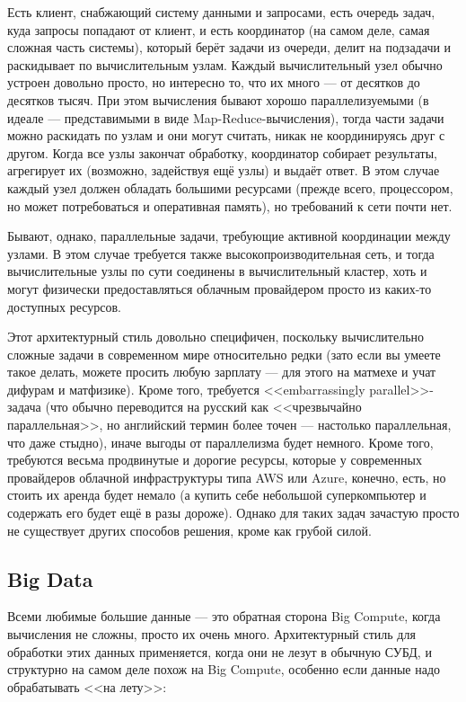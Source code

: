 \documentclass[a5paper]{article}
\begin{document}
Есть клиент, снабжающий систему данными и запросами, есть очередь задач, куда запросы попадают от клиент, и есть координатор (на самом деле, самая сложная часть системы), который берёт задачи из очереди, делит на подзадачи и раскидывает по вычислительным узлам. Каждый вычислительный узел обычно устроен довольно просто, но интересно то, что их много --- от десятков до десятков тысяч. При этом вычисления бывают хорошо параллелизуемыми (в идеале --- представимыми в виде Map-Reduce-вычисления), тогда части задачи можно раскидать по узлам и они могут считать, никак не координируясь друг с другом. Когда все узлы закончат обработку, координатор собирает результаты, агрегирует их (возможно, задействуя ещё узлы) и выдаёт ответ. В этом случае каждый узел должен обладать большими ресурсами (прежде всего, процессором, но может потребоваться и оперативная память), но требований к сети почти нет.

Бывают, однако, параллельные задачи, требующие активной координации между узлами. В этом случае требуется также высокопроизводительная сеть, и тогда вычислительные узлы по сути соединены в вычислительный кластер, хоть и могут физически предоставляться облачным провайдером просто из каких-то доступных ресурсов.

Этот архитектурный стиль довольно специфичен, поскольку вычислительно сложные задачи в современном мире относительно редки (зато если вы умеете такое делать, можете просить любую зарплату --- для этого на матмехе и учат дифурам и матфизике). Кроме того, требуется <<embarrassingly parallel>>-задача (что обычно переводится на русский как <<чрезвычайно параллельная>>, но английский термин более точен --- настолько параллельная, что даже стыдно), иначе выгоды от параллелизма будет немного. Кроме того, требуются весьма продвинутые и дорогие ресурсы, которые у современных провайдеров облачной инфраструктуры типа AWS или Azure, конечно, есть, но стоить их аренда будет немало (а купить себе небольшой суперкомпьютер и содержать его будет ещё в разы дороже). Однако для таких задач зачастую просто не существует других способов решения, кроме как грубой силой.

\subsection{Big Data}

Всеми любимые большие данные --- это обратная сторона Big Compute, когда вычисления не сложны, просто их очень много. Архитектурный стиль для обработки этих данных применяется, когда они не лезут в обычную СУБД, и структурно на самом деле похож на Big Compute, особенно если данные надо обрабатывать <<на лету>>:
\end{document}
